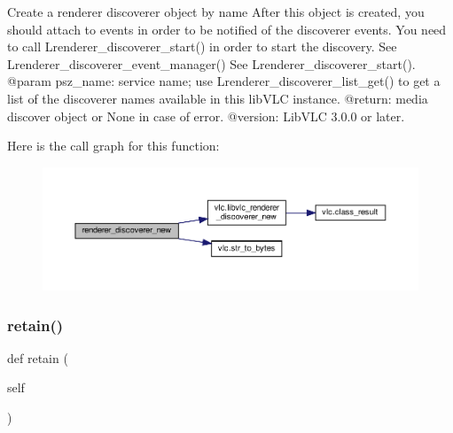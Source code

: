\begin{DoxyVerb}Create a renderer discoverer object by name
After this object is created, you should attach to events in order to be
notified of the discoverer events.
You need to call L{renderer_discoverer_start}() in order to start the
discovery.
See L{renderer_discoverer_event_manager}()
See L{renderer_discoverer_start}().
@param psz_name: service name; use L{renderer_discoverer_list_get}() to get a list of the discoverer names available in this libVLC instance.
@return: media discover object or None in case of error.
@version: LibVLC 3.0.0 or later.
\end{DoxyVerb}
 Here is the call graph for this function\+:
\nopagebreak
\begin{figure}[H]
\begin{center}
\leavevmode
\includegraphics[width=350pt]{classvlc_1_1_instance_af5af3418f6e41d878b2d6f080df10ea5_cgraph}
\end{center}
\end{figure}
\mbox{\label{classvlc_1_1_instance_a6394d82a0b79f0f91bb059d20ab43490}} 
\subsubsection{\texorpdfstring{retain()}{retain()}}
{\footnotesize\ttfamily def retain (\begin{DoxyParamCaption}\item[{}]{self }\end{DoxyParamCaption})}

